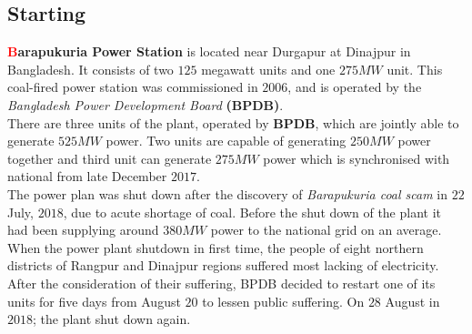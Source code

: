 \documentclass[11 pt]{article}
\begin{document}
\subsection{Starting}
\textbf{{\huge\textcolor{red}{\hspace{5 mm}B}}arapukuria Power Station} is located near Durgapur at Dinajpur in Bangladesh. It consists of two $125$ megawatt units and one $275MW$ unit. This coal-fired power station was commissioned in $2006$, and is operated by the \textit{Bangladesh Power Development Board} \textbf{(BPDB)}.\\
There are three units of the plant, operated by \textbf{BPDB}, which are jointly able to generate \large{\textit{$525MW$}} power. Two units are capable of generating \large{\textit{$250MW$}} power together and third unit can generate \large{\textit{$275MW$}} power which is synchronised with national from late December $2017$.\\
The power plan was shut down after the discovery of \textit{Barapukuria coal scam} in $22$ July, $2018$, due to acute shortage of coal. Before the shut down of the plant it had been supplying around \large{\textit{$380MW$}} power to the national grid on an average.\\
When the power plant shutdown in first time, the people of eight northern districts of Rangpur and Dinajpur regions suffered most lacking of electricity. After the consideration of their suffering, BPDB decided to restart one of its units for five days from August $20$ to lessen public suffering. On $28$ August in $2018$; the plant shut down again.
\end{document}
